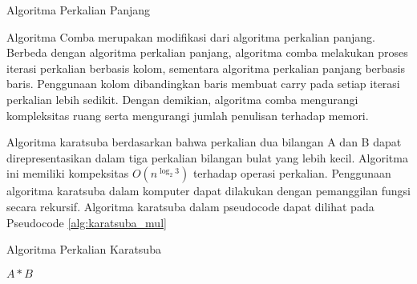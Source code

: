       \begin{algorithm}
        \caption{Algoritma Perkalian Panjang}
        \label{alg:mul}
        \begin{algorithmic}[1]
          \Statex
          \EndFor
          \EndFor
          \State {}
          \EndFunction
        \end{algorithmic}
      \end{algorithm}

      Algoritma Comba merupakan modifikasi dari algoritma perkalian panjang. Berbeda dengan algoritma perkalian panjang, algoritma comba melakukan proses iterasi perkalian berbasis kolom, sementara algoritma perkalian panjang berbasis baris. Penggunaan kolom dibandingkan baris membuat carry pada setiap iterasi perkalian lebih sedikit. Dengan demikian, algoritma comba mengurangi kompleksitas ruang serta mengurangi jumlah penulisan terhadap memori.

      Algoritma karatsuba berdasarkan bahwa perkalian dua bilangan A dan B dapat direpresentasikan dalam tiga perkalian bilangan bulat yang lebih kecil. Algoritma ini memiliki kompeksitas $O(n^{\log_2 3})$ terhadap operasi perkalian. Penggunaan algoritma karatsuba dalam komputer dapat dilakukan dengan pemanggilan fungsi secara rekursif. Algoritma karatsuba dalam pseudocode dapat dilihat pada Pseudocode \ref{alg:karatsuba_mul}

      \begin{algorithm}
        \caption{Algoritma Perkalian Karatsuba}
        \label{alg:karatsuba_mul}
        \begin{algorithmic}[1]
          \Statex
          \State \Return $A * B$
          \EndIf
          \State

          \State {}
          \EndFunction
        \end{algorithmic}
      \end{algorithm}

